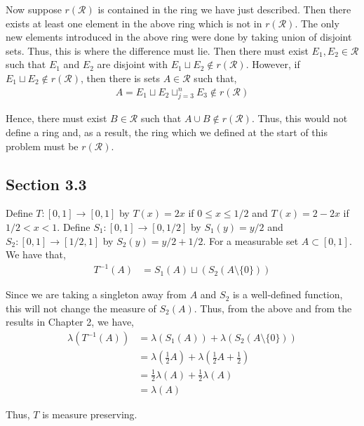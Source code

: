 \documentclass[12pt]{article}
\newenvironment{problem}[2][Problem]{\begin{trivlist}
\item[\hskip \labelsep {\bfseries #1}\hskip \labelsep {\bfseries #2.}]}{\end{trivlist}}
\begin{document}
Now suppose $r(\mathcal{R})$ is contained in the ring we have just described. Then there exists at least one element in the above  ring which is not in $r(\mathcal{R})$. The only new elements introduced in the above ring were done by taking union of disjoint sets. Thus, this is where the difference must lie. Then there must exist $E_1, E_2 \in \mathcal{R}$ such that $E_1$ and $E_2$ are disjoint with $E_1 \sqcup E_2 \not\in r(\mathcal{R})$. However, if $E_1 \sqcup E_2 \not\in r(\mathcal{R})$, then there is sets $A \in \mathcal{R}$ such that,
\begin{align*}
A = E_1 \sqcup E_2 \sqcup_{j=3}^n E_3 \not\in r(\mathcal{R})
\end{align*}

Hence, there must exist $B \in \mathcal{R}$ such that $A \cup B \not\in r(\mathcal{R})$. Thus, this would not define a ring and, as a result, the ring which we defined at the start of this problem must be $r(\mathcal{R})$.

\subsection{Section 3.3}

\begin{problem}{1}
\end{problem}

Define $T: [0, 1] \to [0,1]$ by $T(x) = 2x$ if $0 \leq x \leq 1/2$ and $T(x) = 2 - 2x$ if $1/2 < x < 1$. Define $S_1: [0, 1] \to [0, 1/2]$ by $S_1(y) = y/2$ and $S_2: [0, 1] \to [1/2, 1]$ by $S_2(y) = y/2 + 1/2$. For a measurable set $A \subset [0, 1]$. We have that,
\begin{align*}
T^{-1}(A) &= S_1(A) \sqcup (S_2(A \setminus \{0\}))
\end{align*}

Since we are taking a singleton away from $A$ and $S_2$ is a well-defined function, this will not change the measure of $S_2(A)$. Thus, from the above and from the results in Chapter 2, we have,
\begin{align*}
\lambda(T^{-1}(A)) &= \lambda(S_1(A)) + \lambda(S_2(A \setminus \{0\}))\\
&= \lambda(\frac{1}{2}A) + \lambda(\frac{1}{2}A + \frac{1}{2})\\
&= \frac{1}{2}\lambda(A) + \frac{1}{2}\lambda(A)\\
&= \lambda(A)
\end{align*}

Thus, $T$ is measure preserving.
\end{document}
